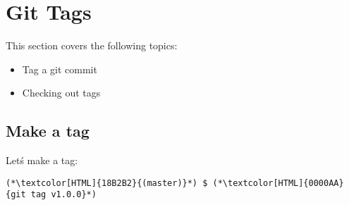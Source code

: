 \section{Git Tags}
\begin{frame}[fragile]
  \slidetitle

  This section covers the following topics:
  \begin{itemize}
    \item Tag a git commit
    \item Checking out tags
  \end{itemize}
\end{frame}

\subsection{Make a tag}
\begin{frame}[fragile]
  \subslidetitle

  Let\'s make a tag:
  \begin{lstlisting}
(*\textcolor[HTML]{18B2B2}{(master)}*) $ (*\textcolor[HTML]{0000AA}{git tag v1.0.0}*)
\end{lstlisting}

\end{frame}


